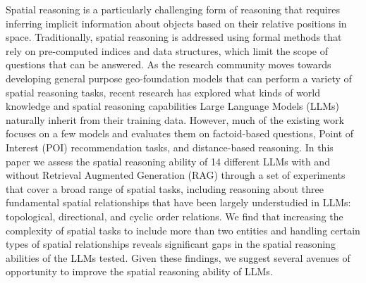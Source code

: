
Spatial reasoning is a particularly challenging form of reasoning that requires inferring implicit information about objects based on their relative positions in space.
Traditionally, spatial reasoning is addressed using formal methods that rely on pre-computed indices and data structures, which limit the scope of questions that can be answered.
As the research community moves towards developing general purpose geo-foundation models that can perform a variety of spatial reasoning tasks, recent research has explored what kinds of world knowledge and spatial reasoning capabilities Large Language Models (LLMs) naturally inherit from their training data.
However, much of the existing work focuses on a few models and evaluates them on factoid-based questions, Point of Interest (POI) recommendation tasks, and distance-based reasoning.
In this paper we assess the spatial reasoning ability of 14 different LLMs with and without Retrieval Augmented Generation (RAG) through a set of experiments that cover a broad range of spatial tasks, including reasoning about three fundamental spatial relationships that have been largely understudied in LLMs: topological, directional, and cyclic order relations.
We find that increasing the complexity of spatial tasks to include more than two entities and handling certain types of spatial relationships reveals significant gaps in the spatial reasoning abilities of the LLMs tested. 
Given these findings, we suggest several avenues of opportunity to improve the spatial reasoning ability of LLMs.






